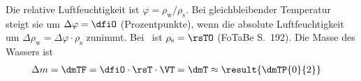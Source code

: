Die relative Luftfeuchtigkeit ist $\varphi = \rho_\text{w}/\rho_\text{s}$. Bei gleichbleibender Temperatur steigt sie um $\Delta\varphi = \dfiO$ (Prozentpunkte), wenn die absolute Luftfeuchtigkeit um $\Delta\rho_\text{w} = \Delta\varphi\cdot\rho_\text{s}$ zunimmt. Bei \thTO\ ist $\rho_\text{s} = \rsTO$ (FoTaBe S.~192). Die Masse des Wassers ist
\begin{align}
 \Delta m &= \dmTF = \dfiO\cdot\rsT\cdot\VT = \dmT \approx \result{\dmTP{0}{2}}
\end{align}

